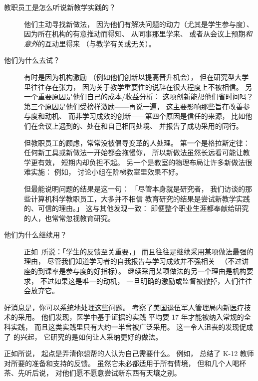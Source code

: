 \begin{description}

\item[教职员工是怎么听说新教学实践的？]
  他们主动寻找新做法，
  因为他们有解决问题的动力（尤其是学生参与度）、
  因为所在机构的有意推动而得知、
  从同事那里学来、
  或者从会议上预期\emph{和意外}的互动里得来
  （与教学有关或无关）。

\item[他们为什么去试？]
  有时是因为机构激励
  （例如他们创新以提高晋升机会），
  但在研究型大学里往往存在张力，
  因为关于教学重要性的说辞在很大程度上不被相信。
  另一个重要原因是他们自己的成本/收益分析：
  这项创新能帮他们省时间吗？
  第三个原因是他们受榜样激励——再说一遍，
  这主要影响那些旨在改善参与度和动机、
  而非学习成效的创新——第四个原因是信任的来源，
  比如他们在会议上遇到的、处在和自己相同处境、
  并报告了成功采用的同行。

  但教职员工的顾虑，常常没被倡导变革的人处理。
  第一个是格拉斯定律：
  任何新工具或新做法一开始都会拖慢你，
  所以新做法虽然长远看可能让教学更有效，
  短期内却负担不起。
  另一个是教室的物理布局让许多新做法很难实施：
  例如，
  讨论小组在阶梯教室里效果不好。

  但最能说明问题的结果是这一句：
  「尽管本身就是研究者，
  我们访谈的那些计算机科学教职员工，大多并不相信
  教育研究的结果是尝试新教学实践的、可信的理由。」
  这与其他发现一致：
  即便整个职业生涯都奉献给研究的人，也常常忽视教育研究。

\item[他们为什么继续用？]
  正如~\cite{Bark2015}所说：「学生的反馈至关重要，」
  而且往往是继续采用某项做法最强的理由，
  尽管我们知道学习者的自我报告与学习成效并不强相关~\cite{Star2014,Uttl2017}
  （不过讲座的到课率是参与度的好指标）。
  继续采用某项做法的另一个理由是机构要求，
  不过如果这是唯一的动机，
  一旦明确的激励或监督被撤掉，人们往往会放弃它。

\end{description}

好消息是，你可以系统地处理这些问题。
\cite{Baue2015}考察了美国退伍军人管理局内新医疗技术的采用。
他们发现，医学中基于证据的实践
平均要 17 年才能被纳入常规的全科实践，
而且这类实践里只有大约一半曾被广泛采用。
这一令人沮丧的发现促成了
的兴起，
它研究的是如何让人采纳更好的做法。

正如所说，
起点是弄清你想帮的人认为自己需要什么。
例如，
\cite{Yada2016}总结了 K-12 教师对所要的准备和支持的反馈。
虽然它未必都适用于所有情境，
但和几个人喝杯茶、先听后说，
对他们愿不愿意尝试新东西有天壤之别。

